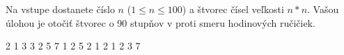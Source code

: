 




Na vstupe dostanete číslo $n$ ($1\leq n \leq 100$) a štvorec čísel veľkosti $n*n$. Vašou úlohou je
otočiť štvorec o 90 stupňov v proti smeru hodinových ručičiek.

2 1 3 
3 2 5 
7 1 2 
 5 2 
1 2 1 
2 3 7 
\koniec


